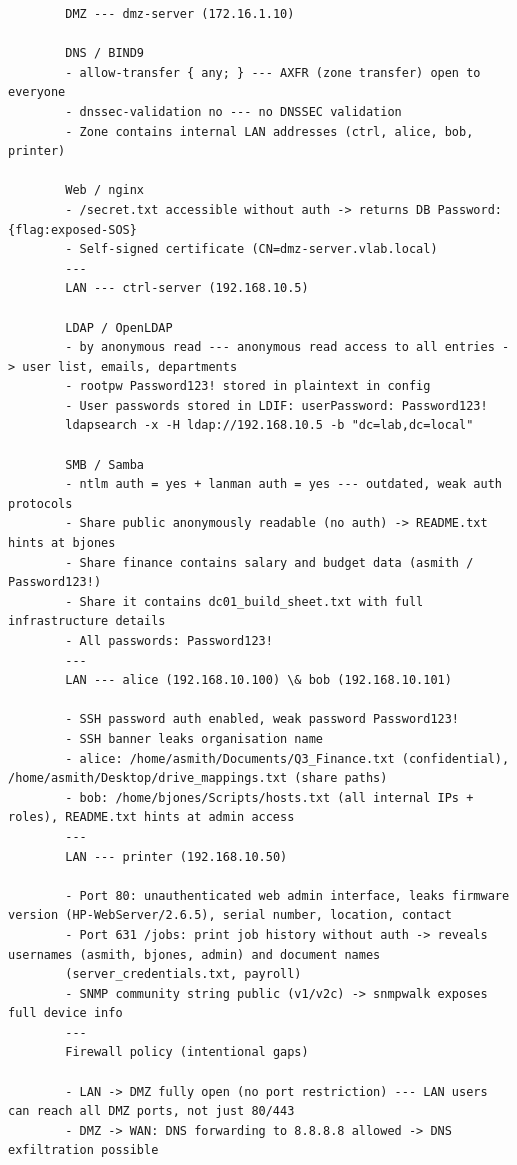 \begin{listing}[H]
	\caption{Introduced Vulnerabilities in the Virtual Enterprise Network}
	\label{lst:flaws-and-vulnerabilities}
	\begin{verbatim}
		DMZ --- dmz-server (172.16.1.10)

		DNS / BIND9
		- allow-transfer { any; } --- AXFR (zone transfer) open to everyone
		- dnssec-validation no --- no DNSSEC validation
		- Zone contains internal LAN addresses (ctrl, alice, bob, printer)

		Web / nginx
		- /secret.txt accessible without auth -> returns DB Password: {flag:exposed-SOS}
		- Self-signed certificate (CN=dmz-server.vlab.local)
		---
		LAN --- ctrl-server (192.168.10.5)

		LDAP / OpenLDAP
		- by anonymous read --- anonymous read access to all entries -> user list, emails, departments
		- rootpw Password123! stored in plaintext in config
		- User passwords stored in LDIF: userPassword: Password123!
		ldapsearch -x -H ldap://192.168.10.5 -b "dc=lab,dc=local"

		SMB / Samba
		- ntlm auth = yes + lanman auth = yes --- outdated, weak auth protocols
		- Share public anonymously readable (no auth) -> README.txt hints at bjones
		- Share finance contains salary and budget data (asmith / Password123!)
		- Share it contains dc01_build_sheet.txt with full infrastructure details
		- All passwords: Password123!
		---
		LAN --- alice (192.168.10.100) \& bob (192.168.10.101)

		- SSH password auth enabled, weak password Password123!
		- SSH banner leaks organisation name
		- alice: /home/asmith/Documents/Q3_Finance.txt (confidential), /home/asmith/Desktop/drive_mappings.txt (share paths)
		- bob: /home/bjones/Scripts/hosts.txt (all internal IPs + roles), README.txt hints at admin access
		---
		LAN --- printer (192.168.10.50)

		- Port 80: unauthenticated web admin interface, leaks firmware version (HP-WebServer/2.6.5), serial number, location, contact
		- Port 631 /jobs: print job history without auth -> reveals usernames (asmith, bjones, admin) and document names
		(server_credentials.txt, payroll)
		- SNMP community string public (v1/v2c) -> snmpwalk exposes full device info
		---
		Firewall policy (intentional gaps)

		- LAN -> DMZ fully open (no port restriction) --- LAN users can reach all DMZ ports, not just 80/443
		- DMZ -> WAN: DNS forwarding to 8.8.8.8 allowed -> DNS exfiltration possible
	\end{verbatim}
\end{listing}

